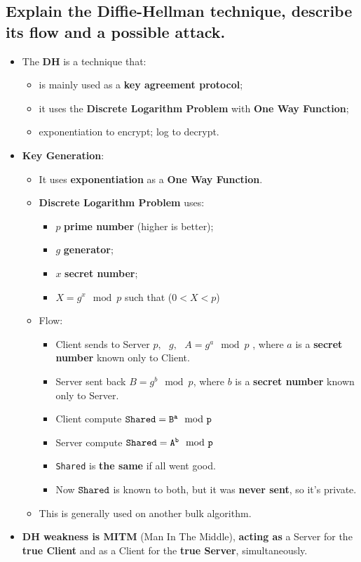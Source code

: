 \documentclass[9pt, letterpaper]{article}
\begin{document}
\subsection{Explain the Diffie-Hellman technique, describe its flow and a possible attack.}
\begin{itemize}
	\item The \textbf{DH} is a technique that:
	\begin{itemize}
		\item is mainly used as a \textbf{key agreement protocol};
		\item it uses the \textbf{Discrete Logarithm Problem} with \textbf{One Way Function};
		\item exponentiation to encrypt; log to decrypt.
	\end{itemize}
	\item \textbf{Key Generation}:
	\begin{itemize}
		\item It uses \textbf{exponentiation} as a \textbf{One Way Function}.
		\item \textbf{Discrete Logarithm Problem} uses:
		\begin{itemize}
			\item $p$ \textbf{prime number} (higher is better);
			\item $g$ \textbf{generator};
			\item $x$ \textbf{secret number};
			\item $X = g^x \mod p$ such that ($0<X<p$)
		\end{itemize}
		\item Flow:
		\begin{itemize}
			\item Client sends to Server $p,\mbox{ }g,\mbox{  }A= g^a\mod p$ , where $a$ is a \textbf{secret number} known only to Client.
			\item Server sent back $B=g^b\mod p$, where $b$ is a \textbf{secret number} known only to Server.
			\item Client compute $\tt{Shared}=B^a\mod p$
			\item Server compute $\tt{Shared}=A^b\mod p$
			\item {\tt Shared} is \textbf{the same} if all went good.
			\item Now $\tt{Shared}$ is known to both, but it was \textbf{never sent}, so it's private.
		\end{itemize}
		\item This is generally used on another bulk algorithm.
	\end{itemize}
	\item \textbf{DH weakness is MITM} (Man In The Middle), \textbf{acting as} a Server for the \textbf{true Client} and as a Client for the \textbf{true Server}, simultaneously.
\end{itemize}
\end{document}

